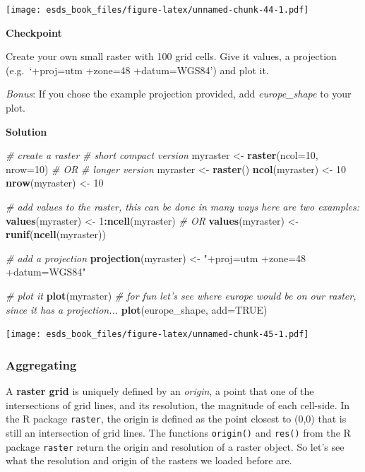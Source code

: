 \documentclass[
]{book}
\newenvironment{Shaded}{\begin{snugshade}}{\end{snugshade}}
\newcommand{\CommentTok}[1]{\textcolor[rgb]{0.56,0.35,0.01}{\textit{#1}}}
\newcommand{\DataTypeTok}[1]{\textcolor[rgb]{0.13,0.29,0.53}{#1}}
\newcommand{\DecValTok}[1]{\textcolor[rgb]{0.00,0.00,0.81}{#1}}
\newcommand{\KeywordTok}[1]{\textcolor[rgb]{0.13,0.29,0.53}{\textbf{#1}}}
\newcommand{\NormalTok}[1]{#1}
\newcommand{\OperatorTok}[1]{\textcolor[rgb]{0.81,0.36,0.00}{\textbf{#1}}}
\newcommand{\OtherTok}[1]{\textcolor[rgb]{0.56,0.35,0.01}{#1}}
\newcommand{\StringTok}[1]{\textcolor[rgb]{0.31,0.60,0.02}{#1}}
\begin{document}
\texttt{[image: esds\_book\_files/figure-latex/unnamed-chunk-44-1.pdf]}

\textbf{Checkpoint}

Create your own small raster with 100 grid cells. Give it values, a projection (e.g.~`+proj=utm +zone=48 +datum=WGS84') and plot it.

\emph{Bonus}: If you chose the example projection provided, add \emph{europe\_shape} to your plot.

\textbf{Solution}

\begin{Shaded}
\begin{Highlighting}[]
\CommentTok{# create a raster}
\CommentTok{# short compact version}
\NormalTok{myraster <-}\StringTok{ }\KeywordTok{raster}\NormalTok{(}\DataTypeTok{ncol=}\DecValTok{10}\NormalTok{, }\DataTypeTok{nrow=}\DecValTok{10}\NormalTok{)}
\CommentTok{# OR }
\CommentTok{# longer version}
\NormalTok{myraster <-}\StringTok{ }\KeywordTok{raster}\NormalTok{()}
\KeywordTok{ncol}\NormalTok{(myraster) <-}\StringTok{ }\DecValTok{10}
\KeywordTok{nrow}\NormalTok{(myraster) <-}\StringTok{ }\DecValTok{10}

\CommentTok{# add values to the raster, this can be done in many ways here are two examples:}
\KeywordTok{values}\NormalTok{(myraster) <-}\StringTok{ }\DecValTok{1}\OperatorTok{:}\KeywordTok{ncell}\NormalTok{(myraster)}
\CommentTok{# OR }
\KeywordTok{values}\NormalTok{(myraster) <-}\StringTok{ }\KeywordTok{runif}\NormalTok{(}\KeywordTok{ncell}\NormalTok{(myraster))}

\CommentTok{# add a projection}
\KeywordTok{projection}\NormalTok{(myraster) <-}\StringTok{ "+proj=utm +zone=48 +datum=WGS84"}

\CommentTok{# plot it}
\KeywordTok{plot}\NormalTok{(myraster)}
\CommentTok{# for fun let's see where europe would be on our raster, since it has a projection...}
\KeywordTok{plot}\NormalTok{(europe_shape, }\DataTypeTok{add=}\OtherTok{TRUE}\NormalTok{)}
\end{Highlighting}
\end{Shaded}

\texttt{[image: esds\_book\_files/figure-latex/unnamed-chunk-45-1.pdf]}

\hypertarget{aggregating}{%
\subsubsection{Aggregating}\label{aggregating}}

A \textbf{raster grid} is uniquely defined by an \emph{origin}, a point that one of the intersections of grid lines, and its resolution, the magnitude of each cell-side. In the R package \texttt{raster}, the origin is defined as the point closest to (0,0) that is still an intersection of grid lines. The functions \texttt{origin()} and \texttt{res()} from the R package \texttt{raster} return the origin and resolution of a raster object. So let's see what the resolution and origin of the rasters we loaded before are.
\end{document}
